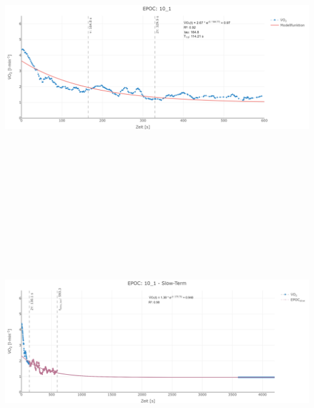 \documentclass[
  letterpaper,
  DIV=11]{scrartcl}
\begin{document}
\includegraphics[width=11.45833in,height=4.6875in]{images/10_1_tau.png}
\includegraphics[width=11.45833in,height=4.6875in]{images/10_1_slow.png}
\end{document}
